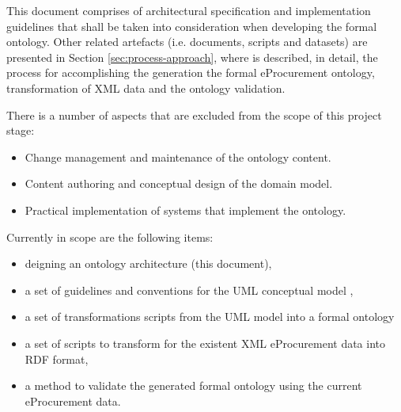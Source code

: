 	This document comprises of architectural specification and implementation guidelines that shall be taken into consideration when developing the formal ontology. Other related artefacts (i.e. documents, scripts and datasets) are presented in Section \ref{sec:process-approach}, where is described, in detail, the process for accomplishing the generation the formal eProcurement ontology, transformation of XML data and the ontology validation.
	
	There is a number of aspects that are excluded from the scope of this project stage:	
	\begin{itemize}
		\item Change management and maintenance of the ontology content.
		\item Content authoring and conceptual design of the domain model.
		\item Practical implementation of systems that implement the ontology.
	\end{itemize}
	
	Currently in scope are the following items:
	\begin{itemize}
		\item deigning an ontology architecture (this document),
		\item a set of guidelines and conventions for the UML conceptual model \citep{costetchi2020b}, 
		\item a set of transformations scripts from the UML model into a formal ontology
		\item a set of scripts to transform for the existent XML eProcurement data into RDF format,
		\item a method to validate the generated formal ontology using the current eProcurement data.
	\end{itemize}